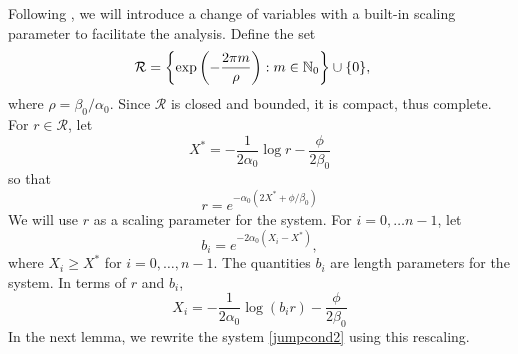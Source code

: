 \documentclass[10pt,reqno]{amsart}
\theoremstyle{plain}
\theoremstyle{definition}
\theoremstyle{remark}
\numberwithin{theorem}{section}
\numberwithin{equation}{section}
\begin{document}
Following \cite[Section 6]{Sandstede1998}, we will introduce a change of variables with a built-in scaling parameter to facilitate the analysis. Define the set
\begin{align}
\mathcal{R} &= \left\{ \mathop\mathrm{exp}\nolimits\left(-\frac{2 \pi m}{\rho}\right) : m \in \mathbb{N}_0 \right\} \cup \{ 0 \},
\end{align}
where $\rho = \beta_0 / \alpha_0$. Since $\mathcal{R}$ is closed and bounded, it is compact, thus complete. For $r \in \mathcal{R}$, let
\begin{equation}\label{Xstar}
X^* = -\frac{1}{2\alpha_0}\log r - \frac{\phi}{2\beta_0}
\end{equation}
so that
\begin{equation}\label{defr}
r = e^{-\alpha_0(2X^* + \phi/\beta_0)}
\end{equation}
We will use $r$ as a scaling parameter for the system. For $i = 0, \dots n-1$, let
\begin{equation}\label{bjscale}
b_i = e^{-2 \alpha_0 (X_i - X^*)},
\end{equation}
where $X_i \geq X^*$ for $i = 0, \dots, n-1$. The quantities $b_i$ are length parameters for the system. In terms of $r$ and $b_i$,
\begin{equation}\label{Xiscale}
X_i = -\frac{1}{2\alpha_0}\log(b_i r) - \frac{\phi}{2 \beta_0}
\end{equation}
In the next lemma, we rewrite the system \eqref{jumpcond2} using this rescaling.
\end{document}
